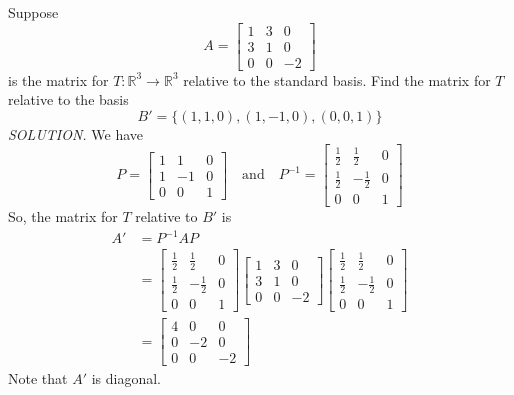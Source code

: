 \documentclass{article}
\newcommand\R{\mathbb{R}}
\begin{document}
    Suppose \[A = \begin{bmatrix}
        1 & 3 & 0 \\
        3 & 1 & 0 \\
        0 & 0 & -2
    \end{bmatrix}\]
    is the matrix for $T: \R^3  \to   \R^3 $ relative to the standard basis. Find the matrix for $T$
    relative to the basis
    \[B' = \{(1,1,0), (1,-1,0), (0,0,1)\}\]
    \textit{\textcolor{blue5}{SOLUTION.}} We have 
    \[P = \begin{bmatrix}
        1 & 1 & 0 \\
        1 & -1 & 0 \\
        0 & 0 & 1
    \end{bmatrix} \quad \text{and} \quad 
    P^{-1} = \begin{bmatrix}
        \frac{1}{2} & \frac{1}{2} & 0 \\
        \frac{1}{2} & - \frac{1}{2} & 0\\
        0 & 0 & 1
    \end{bmatrix}\]
    So, the matrix for $T$ relative to $B'$ is 
    \begin{equation*}
        \begin{split}
            A' &= P^{-1}AP \\
               &= \begin{bmatrix}
        \frac{1}{2} & \frac{1}{2} & 0 \\
        \frac{1}{2} & - \frac{1}{2} & 0\\
        0 & 0 & 1
    \end{bmatrix}\begin{bmatrix}
        1 & 3 & 0 \\
        3 & 1 & 0 \\
        0 & 0 & -2
    \end{bmatrix}\begin{bmatrix}
        \frac{1}{2} & \frac{1}{2} & 0 \\
        \frac{1}{2} & - \frac{1}{2} & 0\\
        0 & 0 & 1
    \end{bmatrix} \\
               &= \begin{bmatrix}
                   4 & 0 & 0\\
                   0 & -2 & 0\\
                   0 & 0 & -2
               \end{bmatrix}
        \end{split}
    \end{equation*}
    Note that $A'$ is diagonal.
\end{document}
